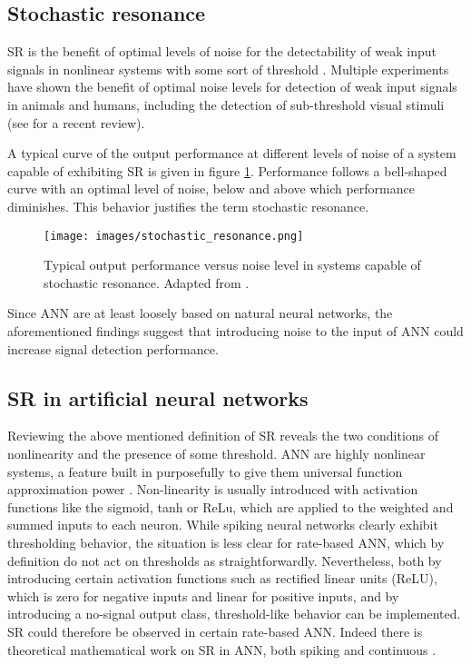 \documentclass{article}
\begin{document}
\subsection{Stochastic resonance}
SR is the benefit of optimal levels of noise for the detectability of weak input signals in nonlinear systems with some sort of threshold \cite{hanggi2002stochastic}. Multiple experiments have shown the benefit of optimal noise levels for detection of weak input signals in animals and humans, including the detection of sub-threshold visual stimuli (see \cite{aihara2010does} for a recent review).

A typical curve of the output performance at different levels of noise of a system capable of exhibiting SR is given in figure \ref{fig:sr}. Performance follows a bell-shaped curve with an optimal level of noise, below and above which performance diminishes. This behavior justifies the term stochastic resonance.

\begin{figure}[thb]
    \centering
	\texttt{[image: images/stochastic\_resonance.png]}
	\captionsetup{width=.55\linewidth}
	\caption{Typical output performance versus noise level in systems capable of stochastic resonance. Adapted from \cite{mcdonnell2009stochastic}.}
	\label{fig:sr}
\end{figure}

Since ANN are at least loosely based on natural neural networks, the aforementioned findings suggest that introducing noise to the input of ANN could increase signal detection performance.


\subsection{SR in artificial neural networks}
Reviewing the above mentioned definition of SR reveals the two conditions of nonlinearity and the presence of some threshold. ANN are highly nonlinear systems, a feature built in purposefully to give them universal function approximation power \cite{csaji2001approximation}. Non-linearity is usually introduced with activation functions like the sigmoid, tanh or ReLu, which are applied to the weighted and summed inputs to each neuron. While spiking neural networks clearly exhibit thresholding behavior, the situation is less clear for rate-based ANN, which by definition do not act on thresholds as straightforwardly. Nevertheless, both by introducing certain activation functions such as rectified linear units (ReLU), which is zero for negative inputs and linear for positive inputs, and by introducing a no-signal output class, threshold-like behavior can be implemented. SR could therefore be observed in certain rate-based ANN. Indeed there is theoretical mathematical work on SR in ANN, both spiking and continuous \cite{patel2008stochastic}.
\end{document}
